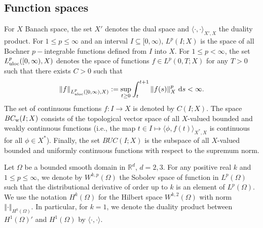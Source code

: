 \documentclass[11pt,reqno]{amsart}
\theoremstyle{remark}
\newcommand \norm[1] {\left\Vert #1\right\Vert}
\def\R{\mathbb{R}}
\def\d{{\rm d}}
\def \l {\langle}
\def \r {\rangle}
\numberwithin{equation}{section}
\def\d{{\rm d}}
\begin{document}
\subsection{Function spaces}
\label{funct}
For $X$ Banach space, the set $X'$ denotes the dual space and $\l \cdot , \cdot \r_{X',X}$ the duality product. For $ 1 \le p \le \infty$ and an interval $I \subseteq [0, \infty)$, $L^p( I; X)$ is the space of all Bochner $p-$integrable functions defined from $I$ into $X$. For $1 \le p < \infty$, the set $L^p_{\rm uloc}([0,\infty), X)$ denotes the space of functions $f \in L^p(0,T;X)$ for any $T>0$ such that there exists $C>0$ such that
$$\norm{ f }_{L^p_{\rm uloc}([0,\infty), X)} :=
\sup_{t \ge 0} \int_t^{t+1}\norm{f(s)}_X^p \, \d s <\infty.
$$
The set of continuous functions $f: I \to X$ is denoted by $C(I;X)$. 
The space $BC_{\rm w}(I;X)$ consists of the topological vector space of
all $X$-valued bounded and weakly continuous functions (i.e., the map $t\in I \mapsto \langle \phi, f(t) \rangle_{X^*, X}$ is continuous for all $\phi \in X^*$). 
Finally, the set $BUC(I; X)$ is the subspace of all $X$-valued bounded and uniformly continuous functions with respect to the supremum norm.

Let $\Omega$ be a bounded smooth domain in $\R^d$, $d=2,3$. For any positive real $k$ and $1\leq p \leq \infty$, we denote by $W^{k,p}(\Omega)$ the Sobolev space of function in $L^p(\Omega)$ such that the distributional derivative of order up to $k$ is an element of $L^p(\Omega)$.  We use the notation $H^k(\Omega)$ for the Hilbert space $W^{k,2}(\Omega)$ with norm $\norm{\cdot}_ {H^k(\Omega)}$. In particular, for $k=1$, we denote the duality product between $H^1(\Omega)'$ and $H^1(\Omega)$ by $\l \cdot, \cdot \r$.
\end{document}
